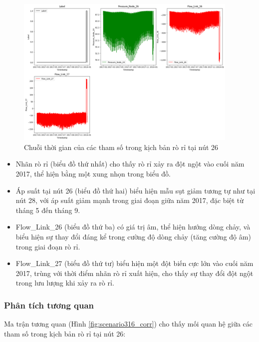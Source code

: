 \begin{figure}[H]
    \centering
    \includegraphics[width=0.95\textwidth]{image/section5_1/scenario316_timeseries.png}
    \caption{Chuỗi thời gian của các tham số trong kịch bản rò rỉ tại nút 26}
    \label{fig:scenario316_timeseries}
\end{figure}

\begin{itemize}
    \item Nhãn rò rỉ (biểu đồ thứ nhất) cho thấy rò rỉ xảy ra đột ngột vào cuối năm 2017, thể hiện bằng một xung nhọn trong biểu đồ.
    \item Áp suất tại nút 26 (biểu đồ thứ hai) biểu hiện mẫu sụt giảm tương tự như tại nút 28, với áp suất giảm mạnh trong giai đoạn giữa năm 2017, đặc biệt từ tháng 5 đến tháng 9.
    \item Flow\_Link\_26 (biểu đồ thứ ba) có giá trị âm, thể hiện hướng dòng chảy, và biểu hiện sự thay đổi đáng kể trong cường độ dòng chảy (tăng cường độ âm) trong giai đoạn rò rỉ.
    \item Flow\_Link\_27 (biểu đồ thứ tư) biểu hiện một đột biến cực lớn vào cuối năm 2017, trùng với thời điểm nhãn rò rỉ xuất hiện, cho thấy sự thay đổi đột ngột trong lưu lượng khi xảy ra rò rỉ.
\end{itemize}

\subsubsection{Phân tích tương quan}

Ma trận tương quan (Hình \ref{fig:scenario316_corr}) cho thấy mối quan hệ giữa các tham số trong kịch bản rò rỉ tại nút 26:

